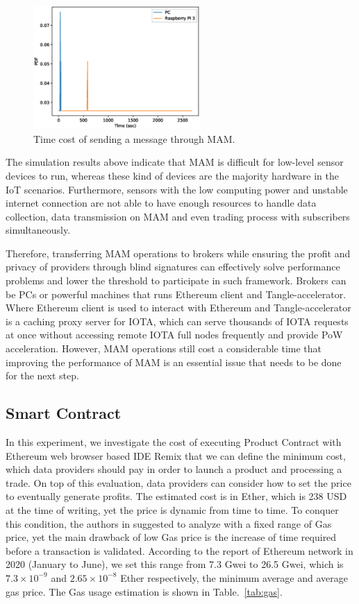 \documentclass[conference]{IEEEtran}
\begin{document}
\begin{figure}[!t]
    \centering
    \includegraphics[width=2.5in]{mam_send}
    \caption{Time cost of sending a message through MAM.}
    \label{fig:mam_send}
\end{figure}

The simulation results above indicate that MAM is difficult for low-level sensor devices to run, whereas these kind of devices are the majority hardware in the IoT scenarios. Furthermore, sensors with the low computing power and unstable internet connection are not able to have enough resources to handle data collection, data transmission on MAM and even trading process with subscribers simultaneously. 

Therefore, transferring MAM operations to brokers while ensuring the profit and privacy of providers through blind signatures can effectively solve performance problems and lower the threshold to participate in such framework. Brokers can be PCs or powerful machines that runs Ethereum client and Tangle-accelerator\cite{TA}. Where Ethereum client is used to interact with Ethereum and Tangle-accelerator is a caching proxy server for IOTA, which can serve thousands of IOTA requests at once without accessing remote IOTA full nodes frequently and provide PoW acceleration. However, MAM operations still cost a considerable time that improving the performance of MAM is an essential issue that needs to be done for the next step.

\subsection{Smart Contract}
In this experiment, we investigate the cost of executing Product Contract with Ethereum web browser based IDE Remix that we can define the minimum cost, which data providers should pay in order to launch a product and processing a trade.  On top of this evaluation, data providers can consider how to set the price to eventually generate profits. The estimated cost is in Ether, which is 238 USD at the time of writing, yet the price is dynamic from time to time. To conquer this condition, the authors in \cite{MindMyValue} suggested to analyze with a fixed range of Gas price,  yet the main drawback of low Gas price is the increase of time required before a transaction is validated. According to the report of Ethereum network\cite{ethereumChart} in 2020 (January to June), we set this range from 7.3 Gwei to 26.5 Gwei, which is $7.3 \times 10^{-9}$ and $2.65 \times 10^{-8}$ Ether respectively, the minimum average and average gas price. The Gas usage estimation is shown in Table.~\ref{tab:gas}.
\end{document}
